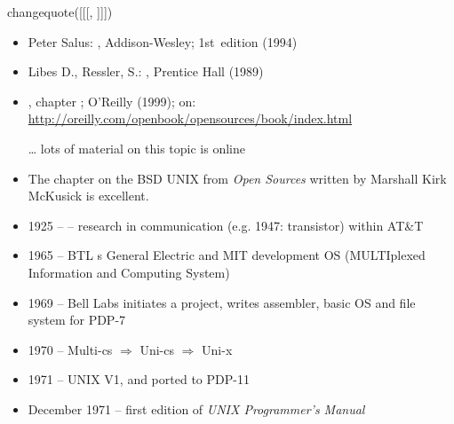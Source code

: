 
changequote([[[, ]]])


\begin{slide}
\begin{itemize}
\item Peter Salus: , Addison-Wesley;
1st~edition (1994)
\item Libes D., Ressler, S.: , Prentice Hall (1989)
\item {},
chapter ; O'Reilly (1999); on:
\url{http://oreilly.com/openbook/opensources/book/index.html}
\item[\ldots] lots of material on this topic is online
\end{itemize}
\end{slide}

\begin{itemize}
\item The chapter on the BSD UNIX from \emph{Open Sources} written by Marshall
Kirk McKusick is excellent.
\end{itemize}


\begin{slide}
\begin{itemize}
\item 1925 --  -- research in
communication (e.g. 1947: transistor) within AT\&T
\item 1965 -- BTL s General Electric and MIT development OS 
(MULTIplexed Information and Computing System) 
\item 1969 -- Bell Labs initiates a project,  writes
assembler, basic OS and file system for PDP-7 
\item 1970 -- Multi-cs $\Rightarrow$ Uni-cs $\Rightarrow$ Uni-x
\item 1971 -- UNIX V1, and ported to PDP-11
\item December 1971 -- first edition of \emph{UNIX Programmer's Manual}
\end{itemize}
\end{slide}

